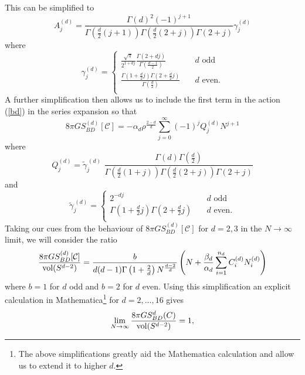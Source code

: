 \documentclass[12pt]{article}
\begin{document}
This can be simplified to 
\begin{equation}
A_j^{(d)}=   \frac{\Gamma\left (d\right)^2 (-1)^{j+1}}{\Gamma\left (\frac{d}{2} (j + 1)\right) \Gamma\left (\frac{d}{2} (2 + j)\right) \Gamma\left (2 + j\right) } \gamma_j^{ (d)}
\label{simplercoefft} 
\end{equation} 
where 
\begin{equation} \gamma_j^{ (d)}= 
\begin{cases} 
\displaystyle\frac{\sqrt{\pi}}{2^{1+dj} }\frac{\Gamma\left (2+dj\right)}{\Gamma\left (\frac{d-1}{2}\right)}    \quad   & d \, \, \mathrm{odd} \\
\displaystyle\frac{\Gamma\left (1+\frac{d}{2}j\right)  \Gamma\left (2+\frac{d}{2}j\right) }{\Gamma\left (\frac{d}{2}\right)}  \quad  & d\mathrm{ \, \,  even.} \\
\end{cases} 
\end{equation} 
A further simplification then allows us to include the first term in the action (\ref{bd}) in the series expansion so that 
\begin{equation} 
8 \pi G S_{BD}^{ (d)}[\mathcal C] = -\alpha_d \rho^{\frac{2-d}{d}} \sum_{j=0}^\infty (-1)^j Q_j^{ (d)} N^{j+1} 
\end{equation}
where 
\begin{equation} 
Q_j^{ (d)}  = {\widetilde \gamma}_j^{\, (d)} \, \, \frac{\Gamma\left (d\right)\Gamma\left (\frac{d}{2}\right)}{\Gamma\left (\frac{d}{2} (1+j)\right) \Gamma\left (\frac{d}{2} (2+j)\right) \Gamma\left (2+j\right)}
\label{fullcoefft} \end{equation}
and
\begin{equation}
{\widetilde \gamma}_j^{\, (d)} = 
\begin{cases} 
2^{-dj}    \quad   &{d} \, \, \mathrm{odd} \\
\Gamma\left (1+\frac{d}{2}j\right) \Gamma\left (2+\frac{d}{2}j\right)   \quad   &d\mathrm{ \, \,  even.} \\
\end{cases} 
\end{equation} 
Taking our cues from the behaviour of $8 \pi G S_{BD}^{ (d)}[\mathcal C]$ for $d=2,3$ in the  $N \rightarrow \infty$ limit,  we will consider the ratio
\begin{equation} 
\frac{ 8 \pi G S_{BD}^{ (d)}[\mathcal C]}{\mathrm{vol} (S^{d-2})} = \frac{b}{d (d-1) \Gamma\left (1+\frac2d\right) N^{\frac{d-2}{d}}} \left ( N + \frac{\beta_d}{\alpha_d} \sum_{i=1}^{n_d} C_i^{ (d)} N_i^{ (d)} \right)  
\label{ratio} 
\end{equation} 
where $b=1$ for $d$ odd and $b=2$ for $d$ even.
Using this simplification an explicit calculation in Mathematica\footnote{The above simplifications greatly aid the Mathematica calculation and allow us to extend it to higher $d$.}  for $d=2, \ldots, 16$ gives 
\begin{equation} 
\lim_{N \rightarrow \infty} \frac{ 8 \pi G S_{BD}^d (C)}{\mathrm{vol} (S^{d-2})} = 1,  
\label{result} 
\end{equation} 
\end{document}
